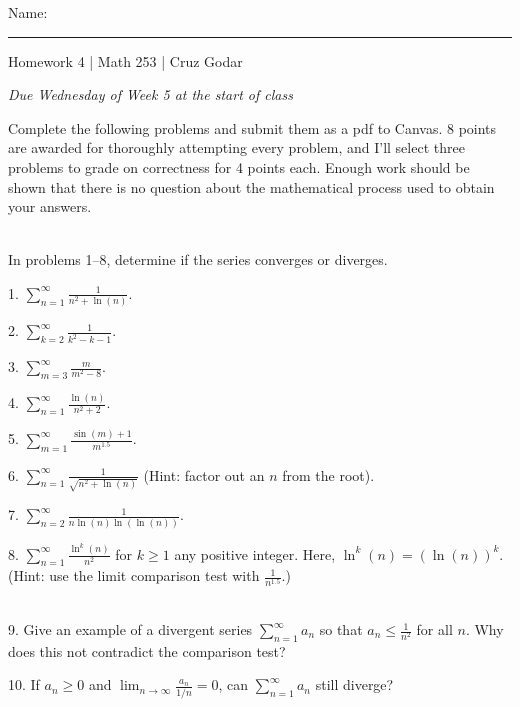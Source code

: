 \documentclass{article}
\begin{document}
\Large Name: \rule{2in}{0.15mm} \hfill Homework 4 | Math 253 | Cruz Godar \vspace{4pt}  \normalsize

\textit{Due Wednesday of Week 5 at the start of class}

Complete the following problems and submit them as a pdf to Canvas. 8 points are awarded for thoroughly attempting every problem, and I'll select three problems to grade on correctness for 4 points each. Enough work should be shown that there is no question about the mathematical process used to obtain your answers.

~\\

In problems 1--8, determine if the series converges or diverges.

1. $\displaystyle \sum_{n = 1}^\infty \frac{1}{n^2 + \ln(n)}$.

2. $\displaystyle \sum_{k = 2}^\infty \frac{1}{k^2 - k - 1}$.

3. $\displaystyle \sum_{m = 3}^\infty \frac{m}{m^2 - 8}$.

4. $\displaystyle \sum_{n = 1}^\infty \frac{\ln(n)}{n^2 + 2}$.

5. $\displaystyle \sum_{m = 1}^\infty \frac{\sin(m) + 1}{m^{1.5}}$.

6. $\displaystyle \sum_{n = 1}^\infty \frac{1}{\sqrt{n^2 + \ln(n)}}$ (Hint: factor out an $n$ from the root).

7. $\displaystyle \sum_{n = 2}^\infty \frac{1}{n\ln(n)\ln(\ln(n))}$.

8. $\displaystyle \sum_{n = 1}^\infty \frac{\ln^k(n)}{n^2}$ for $k \geq 1$ any positive integer. Here, $\ln^k(n) = \left( \ln(n) \right)^k$. (Hint: use the limit comparison test with $\frac{1}{n^{1.5}}$.)

~\\

9. Give an example of a divergent series $\sum_{n = 1}^\infty a_n$ so that $a_n \leq \frac{1}{n^2}$ for all $n$. Why does this not contradict the comparison test?

10. If $a_n \geq 0$ and $\displaystyle \lim_{n \to \infty} \frac{a_n}{1/n} = 0$, can $\sum_{n = 1}^\infty a_n$ still diverge?
\end{document}
